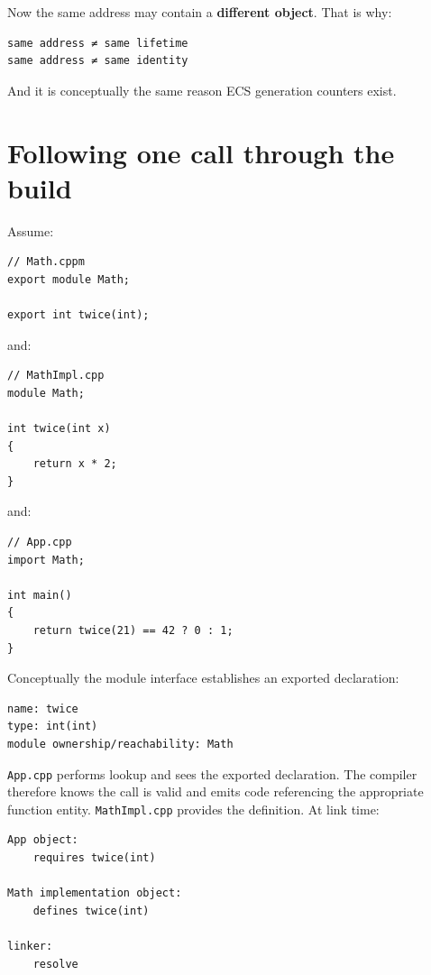 Now the same address may contain a \textbf{different object}. That is why:

\begin{verbatim}
same address ≠ same lifetime
same address ≠ same identity
\end{verbatim}

And it is conceptually the same reason ECS generation counters exist.

\section{Following one call through the build}\label{05-engine-i-ch003-following-one-call-through-the-build}

Assume:

\begin{verbatim}
// Math.cppm
export module Math;

export int twice(int);
\end{verbatim}

and:

\begin{verbatim}
// MathImpl.cpp
module Math;

int twice(int x)
{
    return x * 2;
}
\end{verbatim}

and:

\begin{verbatim}
// App.cpp
import Math;

int main()
{
    return twice(21) == 42 ? 0 : 1;
}
\end{verbatim}

Conceptually the module interface establishes an exported declaration:

\begin{verbatim}
name: twice
type: int(int)
module ownership/reachability: Math
\end{verbatim}

\texttt{App.cpp} performs lookup and sees the exported declaration. The compiler therefore knows the call is valid and emits code referencing the appropriate function entity. \texttt{MathImpl.cpp} provides the definition. At link time:

\begin{verbatim}
App object:
    requires twice(int)

Math implementation object:
    defines twice(int)

linker:
    resolve
\end{verbatim}

